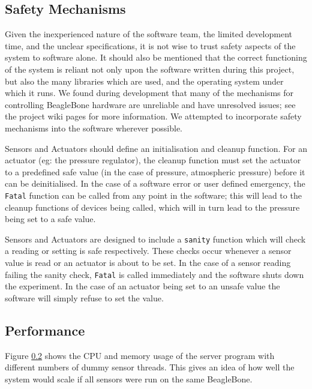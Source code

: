 \subsection{Safety Mechanisms}

Given the inexperienced nature of the software team, the limited development time, and the unclear specifications, it is not wise to trust safety aspects of the system to software alone. It should also be mentioned that the correct functioning of the system is reliant not only upon the software written during this project, but also the many libraries which are used, and the operating system under which it runs. We found during development that many of the mechanisms for controlling BeagleBone hardware are unreliable and have unresolved issues; see the project wiki pages\cite{mctx3420_wiki} for more information. We attempted to incorporate safety mechanisms into the software wherever possible.

Sensors and Actuators should define an initialisation and cleanup function. For an actuator (eg: the pressure regulator), the cleanup function must set the actuator to a predefined safe value (in the case of pressure, atmospheric pressure) before it can be deinitialised. In the case of a software error or user defined emergency, the \verb/Fatal/ function can be called from any point in the software; this will lead to the cleanup functions of devices being called, which will in turn lead to the pressure being set to a safe value. 

Sensors and Actuators are designed to include a \verb/sanity/ function which will check a reading or setting is safe respectively. These checks occur whenever a sensor value is read or an actuator is about to be set. In the case of a sensor reading failing the sanity check, \verb/Fatal/ is called immediately and the software shuts down the experiment. In the case of an actuator being set to an unsafe value the software will simply refuse to set the value.


\subsection{Performance}

Figure \ref{} shows the CPU and memory usage of the server program with different numbers of dummy sensor threads. This gives an idea of how well the system would scale if all sensors were run on the same BeagleBone.

